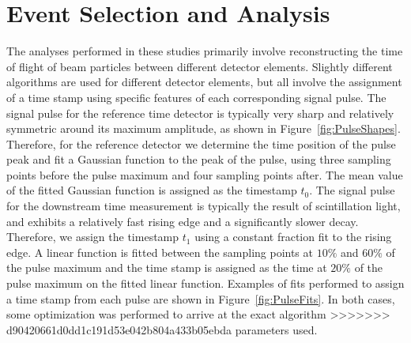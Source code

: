 \documentclass[12pt]{article}
\begin{document}
\section{Event Selection and Analysis}

The analyses performed in these studies primarily involve reconstructing the
time of flight of beam particles between different detector elements. Slightly
different algorithms are used for different detector elements, but all involve
the assignment of a time stamp using specific features of each corresponding
signal pulse. The signal pulse for the reference time detector is typically very
sharp and relatively symmetric around its maximum amplitude, as shown in
Figure~\ref{fig:PulseShapes}. Therefore, for the reference detector we determine
the time position of the pulse peak and fit a Gaussian function to the peak of
the pulse, using three sampling points before the pulse maximum and four
sampling points after. The mean value of the fitted Gaussian function is
assigned as the timestamp $t_{0}$. The signal pulse for the downstream time
measurement is typically the result of scintillation light, and exhibits a
relatively fast rising edge and a significantly slower decay. Therefore, we
assign the timestamp $t_{1}$ using a constant fraction fit to the rising edge. A
linear function is fitted between the sampling points at $10\%$ and $60\%$ of
the pulse maximum and the time stamp is assigned as the time at $20\%$ of the
pulse maximum on the fitted linear function. Examples of fits performed to
assign a time stamp from each pulse are shown in Figure~\ref{fig:PulseFits}. In
both cases, some optimization was performed to arrive at the exact algorithm
>>>>>>> d90420661d0dd1c191d53e042b804a433b05ebda
parameters used.
\end{document}
